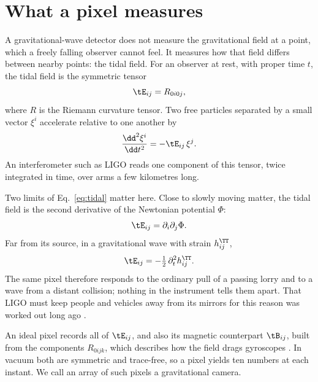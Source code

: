 \section{What a pixel measures}\label{sec:pixel}

A gravitational-wave detector does not measure the gravitational field at a
point, which a freely falling observer cannot feel. It measures how that field
differs between nearby points: the tidal field. For an observer at rest, with
proper time $t$, the tidal field is the symmetric tensor
\begin{equation}\label{eq:tidal}
\tE_{ij} = R_{0i0j},
\end{equation}
where $R$ is the Riemann curvature tensor. Two free particles separated by a
small vector $\xi^i$ accelerate relative to one another by
\begin{equation}\label{eq:deviation}
\frac{\dd^2 \xi^i}{\dd t^2} = -\tE_{ij}\,\xi^j .
\end{equation}
An interferometer such as LIGO reads one component of this tensor, twice
integrated in time, over arms a few kilometres long.

Two limits of Eq.~\eqref{eq:tidal} matter here. Close to slowly moving matter,
the tidal field is the second derivative of the Newtonian potential $\Phi$:
\begin{equation}\label{eq:newton}
\tE_{ij} = \partial_i \partial_j \Phi .
\end{equation}
Far from its source, in a gravitational wave with strain $h_{ij}^{\TT}$,
\begin{equation}\label{eq:wave}
\tE_{ij} = -\tfrac{1}{2}\,\partial_t^2 h_{ij}^{\TT} .
\end{equation}
The same pixel therefore responds to the ordinary pull of a passing lorry and
to a wave from a distant collision; nothing in the instrument tells them
apart. That LIGO must keep people and vehicles away from its mirrors for this
reason was worked out long ago \cite{ThorneWinstein1999}.

An ideal pixel records all of $\tE_{ij}$, and also its magnetic counterpart
$\tB_{ij}$, built from the components $R_{0ijk}$, which describes how the field
drags gyroscopes \cite{Nichols2011}. In vacuum both are symmetric and
trace-free, so a pixel yields ten numbers at each instant. We call an array of
such pixels a gravitational camera.
